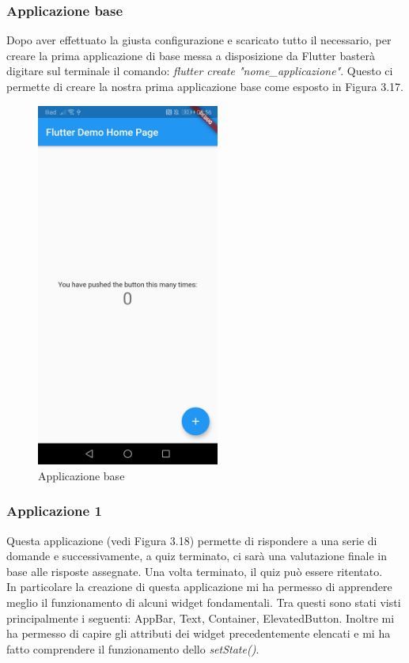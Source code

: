 \subsubsection{Applicazione base}
Dopo aver effettuato la giusta configurazione e scaricato tutto il necessario, per creare la prima applicazione di base messa a disposizione da Flutter basterà digitare sul terminale il comando: \textit{flutter create "nome\_applicazione"}.
Questo ci permette di creare la nostra prima applicazione base come esposto in Figura 3.17.\\

\begin{figure}[htbp]	
	\centering
	\includegraphics[width=6cm]{immagini/base.jpeg}
	\caption{Applicazione base}
	\label{fig:Applicazione base}
\end{figure}

\newpage

\subsubsection{Applicazione 1}
Questa applicazione (vedi Figura 3.18) permette di rispondere a una serie di domande e successivamente, a quiz terminato, ci sarà una valutazione finale in base alle risposte assegnate.
Una volta terminato, il quiz può essere ritentato.\\
In particolare la creazione di questa applicazione mi ha permesso di apprendere meglio il funzionamento di alcuni widget fondamentali.
Tra questi sono stati visti principalmente i seguenti: AppBar, Text, Container, ElevatedButton.
Inoltre mi ha permesso di capire gli attributi dei widget precedentemente elencati e mi ha fatto comprendere il funzionamento dello \textit{setState()}.\\

